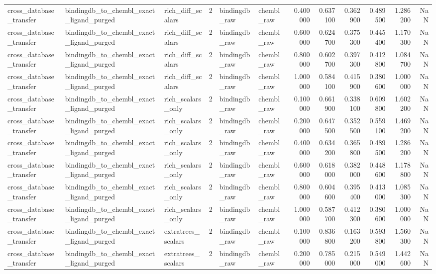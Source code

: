 \begin{longtable}{lllrllrrrrrr}
cross\_database\_transfer & bindingdb\_to\_chembl\_exact\_ligand\_purged & rich\_diff\_scalars & 2 & bindingdb\_raw & chembl\_raw & 0.400000 & 0.637100 & 0.362900 & 0.489500 & 1.286200 & NaN \\
cross\_database\_transfer & bindingdb\_to\_chembl\_exact\_ligand\_purged & rich\_diff\_scalars & 2 & bindingdb\_raw & chembl\_raw & 0.600000 & 0.624700 & 0.375300 & 0.445400 & 1.170300 & NaN \\
cross\_database\_transfer & bindingdb\_to\_chembl\_exact\_ligand\_purged & rich\_diff\_scalars & 2 & bindingdb\_raw & chembl\_raw & 0.800000 & 0.602700 & 0.397300 & 0.412800 & 1.084700 & NaN \\
cross\_database\_transfer & bindingdb\_to\_chembl\_exact\_ligand\_purged & rich\_diff\_scalars & 2 & bindingdb\_raw & chembl\_raw & 1.000000 & 0.584100 & 0.415900 & 0.380600 & 1.000000 & NaN \\
cross\_database\_transfer & bindingdb\_to\_chembl\_exact\_ligand\_purged & rich\_scalars\_only & 2 & bindingdb\_raw & chembl\_raw & 0.100000 & 0.661900 & 0.338100 & 0.609800 & 1.602200 & NaN \\
cross\_database\_transfer & bindingdb\_to\_chembl\_exact\_ligand\_purged & rich\_scalars\_only & 2 & bindingdb\_raw & chembl\_raw & 0.200000 & 0.647500 & 0.352500 & 0.559100 & 1.469200 & NaN \\
cross\_database\_transfer & bindingdb\_to\_chembl\_exact\_ligand\_purged & rich\_scalars\_only & 2 & bindingdb\_raw & chembl\_raw & 0.400000 & 0.634200 & 0.365800 & 0.489500 & 1.286200 & NaN \\
cross\_database\_transfer & bindingdb\_to\_chembl\_exact\_ligand\_purged & rich\_scalars\_only & 2 & bindingdb\_raw & chembl\_raw & 0.600000 & 0.618000 & 0.382000 & 0.448600 & 1.178800 & NaN \\
cross\_database\_transfer & bindingdb\_to\_chembl\_exact\_ligand\_purged & rich\_scalars\_only & 2 & bindingdb\_raw & chembl\_raw & 0.800000 & 0.604600 & 0.395400 & 0.413000 & 1.085300 & NaN \\
cross\_database\_transfer & bindingdb\_to\_chembl\_exact\_ligand\_purged & rich\_scalars\_only & 2 & bindingdb\_raw & chembl\_raw & 1.000000 & 0.587700 & 0.412300 & 0.380600 & 1.000000 & NaN \\
cross\_database\_transfer & bindingdb\_to\_chembl\_exact\_ligand\_purged & extratrees\_scalars & 2 & bindingdb\_raw & chembl\_raw & 0.100000 & 0.836800 & 0.163200 & 0.593800 & 1.560300 & NaN \\
cross\_database\_transfer & bindingdb\_to\_chembl\_exact\_ligand\_purged & extratrees\_scalars & 2 & bindingdb\_raw & chembl\_raw & 0.200000 & 0.785000 & 0.215000 & 0.549000 & 1.442600 & NaN \\

\end{longtable}
